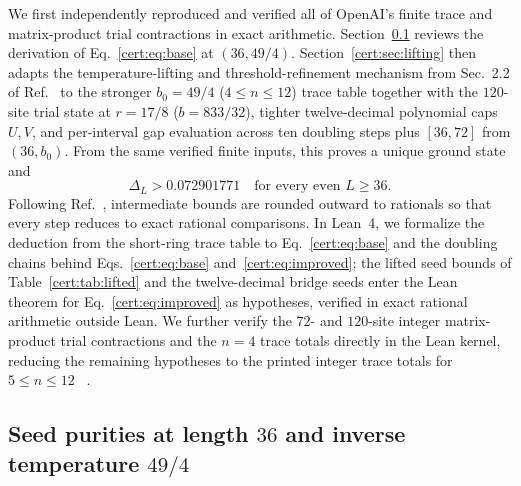 We first independently reproduced and verified all of OpenAI's finite
trace and matrix-product trial contractions in exact arithmetic.
Section~\ref{cert:sec:base} reviews the derivation of
Eq.~\eqref{cert:eq:base} at $(36,49/4)$. Section~\ref{cert:sec:lifting}
then adapts the temperature-lifting and threshold-refinement mechanism
from Sec.~2.2 of Ref.~\cite{OpenAI2026Periodic} to the stronger
$b_0=49/4$ ($4\le n\le12$) trace table together with the $120$-site
trial state at $r=17/8$ ($b=833/32$), tighter twelve-decimal polynomial
caps $U,V$, and per-interval gap evaluation across ten doubling steps
plus $[36,72]$ from $(36,b_0)$. From the same verified finite inputs,
this proves a unique ground state and%
~
\begin{equation}
    \Delta_L>0.072901771
    \quad\text{for every even }L\ge36.
    \label{cert:eq:improved}
\end{equation}
Following Ref.~\cite{OpenAI2026Periodic}, intermediate bounds are
rounded outward to rationals so that every step reduces to exact
rational comparisons. In Lean~4, we formalize the deduction from the short-ring trace table
to Eq.~\eqref{cert:eq:base} and the doubling chains behind
Eqs.~\eqref{cert:eq:base} and~\eqref{cert:eq:improved}; the lifted seed
bounds of Table~\ref{cert:tab:lifted} and the twelve-decimal bridge
seeds enter the Lean theorem for Eq.~\eqref{cert:eq:improved} as
hypotheses, verified in exact rational arithmetic outside Lean. We further
verify the $72$- and $120$-site integer matrix-product trial contractions
and the $n=4$ trace totals directly in the Lean kernel, reducing the
remaining hypotheses to the printed integer trace totals for
$5\le n\le12$%
~.

\subsection{Seed purities at length $36$ and inverse temperature $49/4$}
\label{cert:sec:base}

